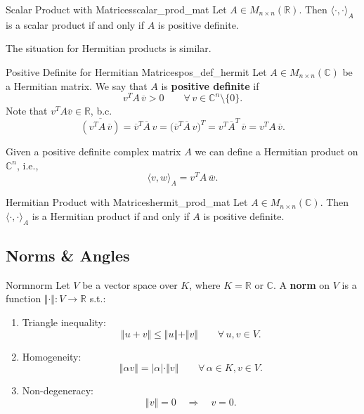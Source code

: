 \begin{proposition}{Scalar Product with Matrices}{scalar_prod_mat}
	Let $A \in M_{n \times n}(\mathbb{R})$. Then $\langle \cdot , \cdot \rangle _A$ is a scalar product if and only if $A$ is positive definite.
\end{proposition}

The situation for Hermitian products is similar.

\begin{definition}{Positive Definite for Hermitian Matrices}{pos_def_hermit}
	Let $A \in M_{n \times n}(\mathbb{C})$ be a Hermitian matrix. We say that $A$ is \textbf{positive definite} if
	\[
		v^T A \, \overline{v} > 0 \qquad \forall \, v \in \mathbb{C}^n \setminus \{0\}.
	\]
	Note that $v^T A \overline{v} \in \mathbb{R}$, b.c. 
	\[
		\overline{(v^T A \, \overline{v})} = \overline{v}^T \overline{A}\, v = \big(\overline{v}^T \overline{A} \, v\big)^T = v^T \overline{A}^T \, \overline{v} = v^T A \, \overline{v}.
	\]
\end{definition}

Given a positive definite complex matrix $A$ we can define a Hermitian product on $\mathbb{C}^n$, i.e., 
\[
	\langle v , w \rangle _A = v^T A \, \overline{w}.
\]

\begin{proposition}{Hermitian Product with Matrices}{hermit_prod_mat}
	Let $A \in M_{n \times n}(\mathbb{C})$. Then $\langle \cdot , \cdot \rangle _A$ is a Hermitian product if and only if $A$ is positive definite.
\end{proposition}

\subsection{Norms \& Angles}

\begin{definition}{Norm}{norm}
	Let $V$ be a vector space over $K$, where $K = \mathbb{R}$ or $\mathbb{C}$. A \textbf{norm} on $V$ is a function $\Vert \cdot \Vert : V \to \mathbb{R}$ s.t.:
	\begin{enumerate}
		\item Triangle inequality:
		\[
			\Vert u + v \Vert \leq \Vert u \Vert + \Vert v \Vert \qquad \forall \, u, v \in V.
		\]
		\item Homogeneity:
		\[
			\Vert \alpha v \Vert = \vert \alpha \vert \cdot \Vert v \Vert \qquad \forall \, \alpha \in K, v \in V.
		\]
		\item Non-degeneracy:
		\[
			\Vert v \Vert = 0 \quad \Longrightarrow \quad v = 0.
		\]
	\end{enumerate}
\end{definition}

